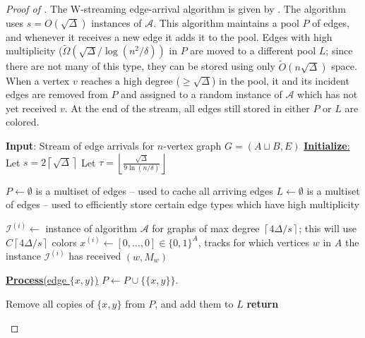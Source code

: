 \documentclass[10pt]{article}
\theoremstyle{definition}\newtheorem{definition}[lemma]{Definition}
\theoremstyle{remark}  \newtheorem*{remark}{Remark}
\newcommand{\cA}{\mathcal{A}}
\newcommand{\cI}{\mathcal{I}}
\newcommand{\tO}{\widetilde{O}}
\newcommand{\tOmega}{\widetilde{\Omega}}
\newcommand{\ceil}[1]{{\left\lceil{#1}\right\rceil}}
\newcommand{\floor}[1]{{\left\lfloor{#1}\right\rfloor}}
\begin{document}
\begin{proof}[Proof of ]
  The W-streaming edge-arrival algorithm is given by . The algorithm uses $s = O(\sqrt{\Delta})$ instances of $\cA$. This algorithm maintains a pool $P$ of edges, and whenever it receives a new edge it adds it to the pool. Edges with high multiplicity ($\tOmega(\sqrt{\Delta}/\log(n^2/\delta))$ in $P$ are moved to a different pool $L$; since there are not many of this type, they can be stored using only $\tO(n\sqrt{\Delta})$ space. When a vertex $v$ reaches a high degree ($\ge\sqrt{\Delta}$) in the pool, it and its incident edges are removed from $P$ and assigned to a random instance of $\cA$ which has not yet received $v$. At the end of the stream, all edges still stored in either $P$ or $L$ are colored.
  
  \begin{algorithm}[htb!]
    \caption{W-streaming algorithm for $O(\Delta)$ edge coloring on edge-arrival stream given black-box access to algorithm $\cA$ for $C \Delta$ edge coloring on vertex-arrival stream\label{alg:va-to-ea-conversion}}
    \begin{algorithmic}[1]
    \Statex \textbf{Input}: Stream of edge arrivals for $n$-vertex graph $G=(A \sqcup B,E)$
      \Statex
      \Statex \underline{\textbf{Initialize}:}
      \State Let $s = 2 \ceil{\sqrt{\Delta}}$ %
      \State Let $\tau = \floor{\frac{\sqrt{\Delta}}{9 \ln(n/\delta)}}$ %
      
      \State $P \gets \emptyset$ is a multiset of edges -- used to cache all arriving edges
      \State $L \gets \emptyset$ is a multiset of edges -- used to efficiently store certain edge types which have high multiplicity %
      
        \State $\cI^{(i)} \gets$ instance of algorithm $\cA$ for graphs of max degree $\ceil{4 \Delta / s}$; this will use $C \ceil{4 \Delta / s}$ colors
        \State $x^{(i)} \gets [0,\ldots,0] \in \{0,1\}^A$, tracks for which vertices $w$ in $A$ the instance $\cI^{(i)}$ has received $(w,M_w)$
      \EndFor
      
    \Statex \underline{\textbf{Process}(edge $\{x,y\}$)}
      \State $P \gets P \cup \{\{x,y\}\}$.
      
        \State Remove all copies of $\{x,y\}$ from $P$, and add them to $L$\label{step:va-to-ea-conversion-hide-highmult}
        \State \textbf{return}
      \EndIf
      

\end{algorithmic}
\end{algorithm}
\end{proof}
\end{document}
